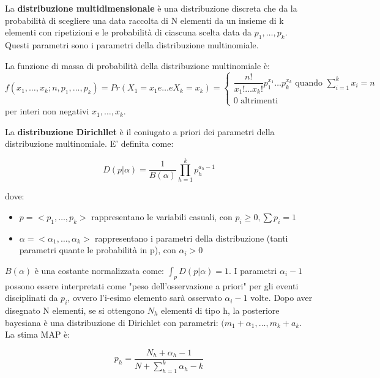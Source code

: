 \documentclass[a4paper]{extarticle}
\begin{document}
La \textbf{distribuzione multidimensionale} è una distribuzione discreta  che da la probabilità di scegliere una data raccolta di N elementi da un insieme di k elementi con ripetizioni e le probabilità di ciascuna scelta data da $p_1, \dots,p_k$.  Questi parametri sono i parametri della distribuzione multinomiale.

La funzione di massa di probabilità della distribuzione multinomiale è:
\begin{equation*}
f(x_1,\dots,x_k;n,p_1,\dots,p_k) = Pr(X_1 = x_1 e \dots e X_k =x_k) =
\begin{cases}
		\dfrac{n!}{x_1!\dots x_k!} p_1^{x_1}\dots p_k^{x_k} \text{ quando }  \sum\limits_{i=1}^k x_i = n \\
		0 \text{ altrimenti}
	\end{cases}
\end{equation*}
per interi non negativi $x_1,\dots,x_k$.

La \textbf{distribuzione Dirichllet} è il coniugato a priori dei parametri della distribuzione multinomiale. E' definita come:

\begin{equation*}
D(p| \alpha) = \dfrac{1}{B(\alpha)}\prod_{h=1}^k p_h^{a_h-1}
\end{equation*}

dove:

\begin{itemize}
\item $p = <p_1,\dots,p_k>$ rappresentano le variabili casuali, con $p_i \geq 0, \sum p_i =1$
\item $\alpha = <\alpha_1, \dots, \alpha_k>$ rappresentano i parametri della distribuzione (tanti parametri quante le probabilità in p), con $\alpha_i>0$
\end{itemize}

$B(\alpha)$ è una costante normalizzata come: $\int_p D(p| \alpha) =1$. I parametri $\alpha_i-1$ possono essere interpretati come "peso dell'osservazione a priori" per gli eventi disciplinati da $p_i$, ovvero l'i-esimo elemento sarà osservato $\alpha_i-1$ volte. Dopo aver disegnato N elementi, se si ottengono $N_h$ elementi di tipo h, la posteriore bayesiana è una distribuzione di Dirichlet con parametri: $(m_1 + \alpha_1, \dots, m_k+a_k$. La stima MAP è:

\begin{equation*}
p_h = \dfrac{N_h + \alpha_h - 1}{N + \sum\limits_{h=1}^k \alpha_h - k}
\end{equation*}
\end{document}
